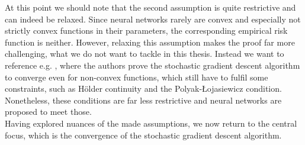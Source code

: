 At this point we should note that the second assumption is quite restrictive and can indeed be relaxed. Since neural networks rarely are convex and especially not strictly convex functions in their parameters, the corresponding empirical risk function is neither. However, relaxing this assumption makes the proof far more challenging, what we do not want to tackle in this thesis. Instead we want to reference e.g. \cite{lei2019stochastic}, where the authors prove the stochastic gradient descent algorithm to converge even for non-convex functions, which still have to fulfil some constraints, such as Hölder continuity and the Polyak-\L{}ojasiewicz condition. Nonetheless, these conditions are far less restrictive and neural networks are proposed to meet those.\\
Having explored nuances of the made assumptions, we now return to the central focus, which is the convergence of the stochastic gradient descent algorithm.

